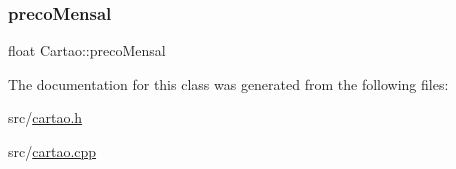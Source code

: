 \mbox{\label{class_cartao_adfaee23e98127abf18d04e93aa453f57}} 
\subsubsection{\texorpdfstring{preco\+Mensal}{precoMensal}}
{\footnotesize\ttfamily float Cartao\+::preco\+Mensal\hspace{0.3cm}{\ttfamily [private]}}



The documentation for this class was generated from the following files\+:\begin{DoxyCompactItemize}
\item 
src/\mbox{\hyperlink{cartao_8h}{cartao.\+h}}\item 
src/\mbox{\hyperlink{cartao_8cpp}{cartao.\+cpp}}\end{DoxyCompactItemize}
